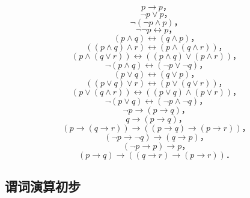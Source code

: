 \[ p \to p                                                             \text{，} \tag{同一律} \]
\[ \lnot{}p \lor p                                                     \text{，} \tag{排中律} \]
\[ \lnot(\lnot{}p \land p)                                             \text{，} \tag{矛盾律} \]
\[ \lnot\lnot{}p \leftrightarrow p                                     \text{，} \tag{双重否定律} \]
\[ (p \land q) \leftrightarrow (q \land p)                             \text{，} \tag{合取交换律} \]
\[ ((p \land q) \land r) \leftrightarrow (p \land (q \land r))         \text{，} \tag{合取结合律} \]
\[ (p \land (q \lor r)) \leftrightarrow ((p \land q) \lor (p \land r)) \text{，} \tag{分配律} \]
\[ \lnot(p \land q) \leftrightarrow (\lnot{}p \lor \lnot{}q)           \text{，} \tag{德·摩根律} \]
\[ (p \lor q) \leftrightarrow (q \lor p)                               \text{，} \tag{析取交换律} \]
\[ ((p \lor q) \lor r) \leftrightarrow (p \lor (q \lor r))             \text{，} \tag{析取结合律} \]
\[ (p \lor (q \land r)) \leftrightarrow ((p \lor q) \land (p \lor r))  \text{，} \tag{分配律} \]
\[ \lnot(p \lor q) \leftrightarrow (\lnot{}p \land \lnot{}q)           \text{，} \tag{德·摩根律} \]
\[ \lnot{}p \to (p \to q)                                              \text{，} \tag{否定前件律} \]
\[ q \to (p \to q)                                                     \text{，} \tag{肯定后件律} \]
\[ (p \to (q \to r)) \to ((p \to q) \to (p \to r))                     \text{，} \tag{蕴含词分配律} \]
\[ (\lnot{}p \to \lnot{}q) \to (q \to p)                               \text{，} \tag{换位律} \]
\[ (\lnot{}p \to p) \to p                                              \text{，} \tag{否定肯定律} \]
\[ (p \to q) \to ((q \to r) \to (p \to r))                             \text{．} \tag{假设三段论} \]

\subsection{谓词演算初步}

